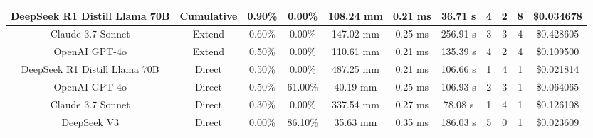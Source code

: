 \begin{landscape}
\begin{table}[H]
\begin{center}
\begin{tabular}{|c|c|c|c|c|c|c|c|c|c|c|}
    \hline
    DeepSeek R1 Distill Llama 70B & Cumulative & 0.90\% & 0.00\% & 108.24 mm & 0.21 ms & 36.71 s & 4 & 2 & 8 & \$0.034678 \\
    \hline
    Claude 3.7 Sonnet & Extend & 0.60\% & 0.00\% & 147.02 mm & 0.25 ms & 256.91 s & 3 & 3 & 4 & \$0.428605 \\
    \hline
    OpenAI GPT-4o & Extend & 0.50\% & 0.00\% & 110.61 mm & 0.21 ms & 135.39 s & 4 & 2 & 4 & \$0.109500 \\
    \hline
    DeepSeek R1 Distill Llama 70B & Direct & 0.50\% & 0.00\% & 487.25 mm & 0.21 ms & 106.66 s & 1 & 4 & 1 & \$0.021814 \\
    \hline
    OpenAI GPT-4o & Direct & 0.50\% & 61.00\% & 40.19 mm & 0.25 ms & 106.93 s & 2 & 3 & 1 & \$0.064065 \\
    \hline
    Claude 3.7 Sonnet & Direct & 0.30\% & 0.00\% & 337.54 mm & 0.27 ms & 78.08 s & 1 & 4 & 1 & \$0.126108 \\
    \hline
    DeepSeek V3 & Direct & 0.00\% & 86.10\% & 35.63 mm & 0.35 ms & 186.03 s & 5 & 0 & 1 & \$0.023609 \\
    \hline
\end{tabular}
\label{Results-Position-3-5}
\end{center}
\end{table}


\end{landscape}
